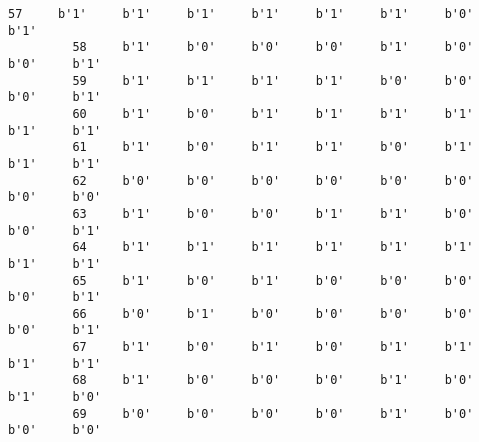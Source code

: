 \documentclass[11pt]{article}
\begin{document}
\begin{Verbatim}[commandchars=\\\{\}]
         57     b'1'     b'1'     b'1'     b'1'     b'1'     b'1'     b'0'     b'1'   
         58     b'1'     b'0'     b'0'     b'0'     b'1'     b'0'     b'0'     b'1'   
         59     b'1'     b'1'     b'1'     b'1'     b'0'     b'0'     b'0'     b'1'   
         60     b'1'     b'0'     b'1'     b'1'     b'1'     b'1'     b'1'     b'1'   
         61     b'1'     b'0'     b'1'     b'1'     b'0'     b'1'     b'1'     b'1'   
         62     b'0'     b'0'     b'0'     b'0'     b'0'     b'0'     b'0'     b'0'   
         63     b'1'     b'0'     b'0'     b'1'     b'1'     b'0'     b'0'     b'1'   
         64     b'1'     b'1'     b'1'     b'1'     b'1'     b'1'     b'1'     b'1'   
         65     b'1'     b'0'     b'1'     b'0'     b'0'     b'0'     b'0'     b'1'   
         66     b'0'     b'1'     b'0'     b'0'     b'0'     b'0'     b'0'     b'1'   
         67     b'1'     b'0'     b'1'     b'0'     b'1'     b'1'     b'1'     b'1'   
         68     b'1'     b'0'     b'0'     b'0'     b'1'     b'0'     b'1'     b'0'   
         69     b'0'     b'0'     b'0'     b'0'     b'1'     b'0'     b'0'     b'0'   
         

\end{Verbatim}
\end{document}
